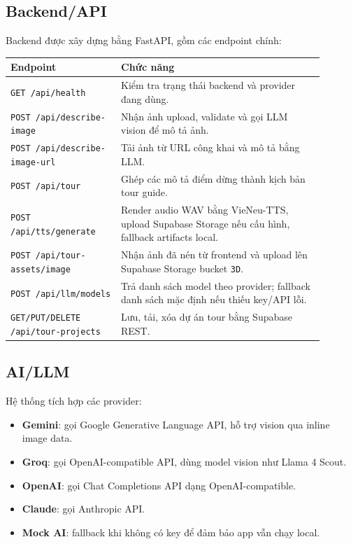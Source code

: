 \documentclass[12pt,a4paper]{article}
\begin{document}
\subsection{Backend/API}

Backend được xây dựng bằng FastAPI, gồm các endpoint chính:

\begin{longtable}{p{0.31\linewidth} p{0.58\linewidth}}
\toprule
\textbf{Endpoint} & \textbf{Chức năng} \\
\midrule
\texttt{GET /api/health} & Kiểm tra trạng thái backend và provider đang dùng. \\
\texttt{POST /api/describe-image} & Nhận ảnh upload, validate và gọi LLM vision để mô tả ảnh. \\
\texttt{POST /api/describe-image-url} & Tải ảnh từ URL công khai và mô tả bằng LLM. \\
\texttt{POST /api/tour} & Ghép các mô tả điểm dừng thành kịch bản tour guide. \\
\texttt{POST /api/tts/generate} & Render audio WAV bằng VieNeu-TTS, upload Supabase Storage nếu cấu hình, fallback artifacts local. \\
\texttt{POST /api/tour-assets/image} & Nhận ảnh đã nén từ frontend và upload lên Supabase Storage bucket \texttt{3D}. \\
\texttt{POST /api/llm/models} & Trả danh sách model theo provider; fallback danh sách mặc định nếu thiếu key/API lỗi. \\
\texttt{GET/PUT/DELETE /api/tour-projects} & Lưu, tải, xóa dự án tour bằng Supabase REST. \\
\bottomrule
\end{longtable}

\subsection{AI/LLM}

Hệ thống tích hợp các provider:

\begin{itemize}
  \item \textbf{Gemini}: gọi Google Generative Language API, hỗ trợ vision qua inline image data.
  \item \textbf{Groq}: gọi OpenAI-compatible API, dùng model vision như Llama 4 Scout.
  \item \textbf{OpenAI}: gọi Chat Completions API dạng OpenAI-compatible.
  \item \textbf{Claude}: gọi Anthropic API.
  \item \textbf{Mock AI}: fallback khi không có key để đảm bảo app vẫn chạy local.
\end{itemize}
\end{document}
